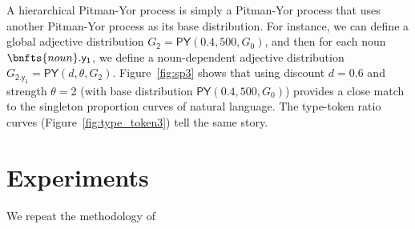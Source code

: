 \documentclass[11pt]{article}
\renewcommand{\bnfpn}[1]{\mathsf{#1}}
\begin{document}
A hierarchical Pitman-Yor process is simply a Pitman-Yor process that uses another Pitman-Yor process as its base distribution. For instance, we can define a global adjective distribution $G_\mathsf{2} = \mathsf{PY}(0.4, 500, G_0)$, and then for each noun $\bnfts{noun}.\bnfpn{y_1}$, we define a noun-dependent adjective distribution $G_\mathsf{\bnfpn{2.y_1}} = \mathsf{PY}(d, \theta, G_\bnfpn{2})$. Figure~\ref{fig:sp3} shows that using discount $d=0.6$ and strength $\theta=2$ (with base distribution $\mathsf{PY}(0.4, 500, G_0)$) provides a close match to the singleton proportion curves of natural language. The type-token ratio curves (Figure~\ref{fig:type_token3}) tell the same story. 

\section{Experiments}

We repeat the methodology of \cite{white-etal-2021-non}





\appendix
\end{document}
